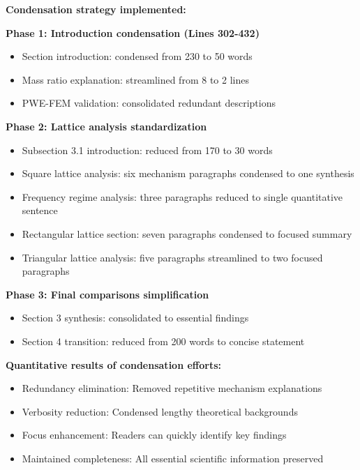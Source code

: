 \documentclass[11pt,a4paper]{article}
\newenvironment{changesbox}{%
    \par\medskip\noindent{\color{changescolor}\rule{\linewidth}{2pt}}\par
    \noindent{\color{changescolor}\bfseries Manuscript Changes}\par\smallskip
}{%
    \par\noindent{\color{changescolor}\rule{\linewidth}{0.5pt}}\medskip
}
\begin{document}
\begin{changesbox}
\textbf{Condensation strategy implemented:}

\textbf{Phase 1: Introduction condensation (Lines 302-432)}
\begin{itemize}
    \item Section introduction: condensed from 230 to 50 words
    \item Mass ratio explanation: streamlined from 8 to 2 lines
    \item PWE-FEM validation: consolidated redundant descriptions
\end{itemize}

\textbf{Phase 2: Lattice analysis standardization}
\begin{itemize}
    \item Subsection 3.1 introduction: reduced from 170 to 30 words
    \item Square lattice analysis: six mechanism paragraphs condensed to one synthesis
    \item Frequency regime analysis: three paragraphs reduced to single quantitative sentence
    \item Rectangular lattice section: seven paragraphs condensed to focused summary
    \item Triangular lattice analysis: five paragraphs streamlined to two focused paragraphs
\end{itemize}

\textbf{Phase 3: Final comparisons simplification}
\begin{itemize}
    \item Section 3 synthesis: consolidated to essential findings
    \item Section 4 transition: reduced from 200 words to concise statement
\end{itemize}

\textbf{Quantitative results of condensation efforts:}
\begin{itemize}
    \item Redundancy elimination: Removed repetitive mechanism explanations
    \item Verbosity reduction: Condensed lengthy theoretical backgrounds
    \item Focus enhancement: Readers can quickly identify key findings
    \item Maintained completeness: All essential scientific information preserved
\end{itemize}
\end{changesbox}
\end{document}
